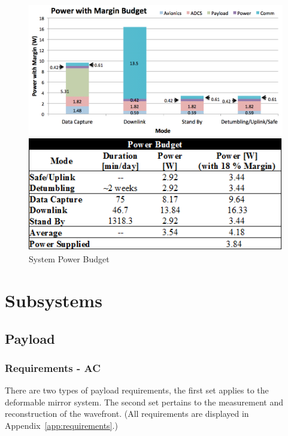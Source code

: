 \documentclass[12pt]{article}
\begin{document}
			\begin{figure}[!ht]
				\centering
				\includegraphics[width=5in]{images/MissionOverview_4.png}
				
				\includegraphics[width=5in]{images/MissionOverview_6.png}
				\caption{System Power Budget}
				\label{fig:Mission_power2}
			\end{figure}
			
\section{Subsystems}


		\subsection{Payload}

			\subsubsection{Requirements - AC}
There are two types of payload requirements, the first set applies to the deformable mirror system.  The second set pertains to the measurement and reconstruction of the wavefront.  (All requirements are displayed in Appendix~\ref{app:requirements}.) 
\end{document}

